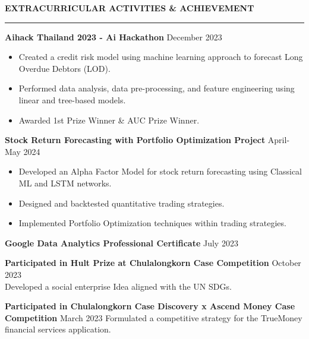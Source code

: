 \documentclass[11pt]{article}
\begin{document}
\vspace{12pt}
\textbf{EXTRACURRICULAR ACTIVITIES \& ACHIEVEMENT}
\vspace{5pt}
{\color{NavyBlue}\hrule}
\vspace{9pt}

\textbf{Aihack Thailand 2023 - Ai Hackathon} \hfill December 2023
\begin{itemize}[noitemsep, topsep=0pt, partopsep=0pt, parsep=0pt]
    \item Created a credit risk model using machine learning approach to forecast Long Overdue Debtors (LOD).
    \item Performed data analysis, data pre-processing, and feature engineering using linear and tree-based models.
    \item Awarded 1st Prize Winner \& AUC Prize Winner.
\end{itemize}

\vspace{6pt}

\textbf{Stock Return Forecasting with Portfolio Optimization Project} \hfill April-May 2024
\begin{itemize}[noitemsep, topsep=0pt, partopsep=0pt, parsep=0pt]
    \item Developed an Alpha Factor Model for stock return forecasting using Classical ML and LSTM networks.
    \item Designed and backtested quantitative trading strategies.
    \item Implemented Portfolio Optimization techniques within trading strategies.
\end{itemize}

\vspace{6pt}

\textbf{Google Data Analytics Professional Certificate} \hfill July 2023

\vspace{6pt}

\textbf{Participated in Hult Prize at Chulalongkorn Case Competition} \hfill October 2023\\
\hspace*{7pt} Developed a social enterprise Idea aligned with the UN SDGs.

\vspace{6pt}

\textbf{Participated in Chulalongkorn Case Discovery x Ascend Money Case Competition} \hfill March 2023
\hspace*{7pt} Formulated a competitive strategy for the TrueMoney financial services application.
\end{document}
